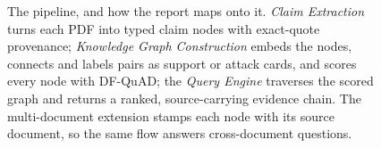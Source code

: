 \documentclass{article}
\begin{document}
\begin{figure}[t]
{%
}
\caption{The pipeline, and how the report maps onto it. \emph{Claim Extraction}
turns each PDF into typed claim nodes with exact-quote provenance;
\emph{Knowledge Graph Construction} embeds the nodes, connects and labels pairs
as support or attack cards, and scores every node with DF-QuAD; the \emph{Query
Engine} traverses the scored graph and returns a ranked, source-carrying
evidence chain. The multi-document extension stamps each node with its source
document, so the same flow answers cross-document questions.}
\label{fig:pipeline}
\end{figure}



\end{document}

